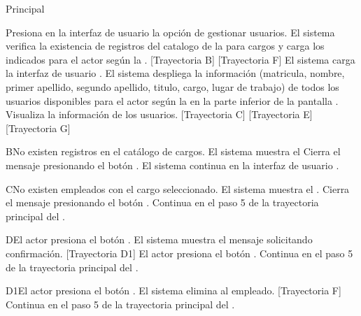 \begin{UCtrayectoria}{Principal}
	
	\UCpaso[\UCactor] Presiona en la interfaz de usuario  la opción de gestionar usuarios. 
	\UCpaso  El sistema verifica la existencia de registros del catalogo de la  para cargos  y carga los indicados para el actor según la  . [Trayectoria B] [Trayectoria F] 
	\UCpaso El sistema carga la interfaz de usuario  .
	\UCpaso El sistema despliega la información (matricula,  nombre, primer apellido, segundo apellido, titulo, cargo, lugar de trabajo) de todos los usuarios disponibles para el actor según la   en la parte inferior de la pantalla .
	\UCpaso [\UCactor] Visualiza la información de los usuarios.  [Trayectoria C] [Trayectoria E] [Trayectoria G]
\end{UCtrayectoria}

\begin{UCtrayectoriaA}{B}{No existen registros en el catálogo de cargos.}
	\UCpaso     El sistema muestra el 	
	\UCpaso[\UCactor] Cierra el mensaje presionando el botón .
	\UCpaso  El sistema continua en la interfaz de usuario .
\end{UCtrayectoriaA}

\begin{UCtrayectoriaA}{C}{No existen  empleados con el cargo seleccionado.}
	\UCpaso     El sistema muestra el .
	\UCpaso[\UCactor] Cierra el mensaje presionando el botón .
	\UCpaso Continua en el paso 5 de la trayectoria principal del .
\end{UCtrayectoriaA}


\begin{UCtrayectoriaA}{D}{El actor presiona el botón .}
	\UCpaso El sistema muestra el mensaje  solicitando confirmación. [Trayectoria D1]
	\UCpaso[\UCactor] El actor presiona el botón .
	\UCpaso Continua en el paso 5 de la trayectoria principal del .  	
\end{UCtrayectoriaA}

\begin{UCtrayectoriaA}{D1}{El actor presiona el botón .}
	\UCpaso     El sistema elimina al empleado. [Trayectoria F] 
	\UCpaso Continua en el paso 5 de la trayectoria principal del .  
\end{UCtrayectoriaA}


